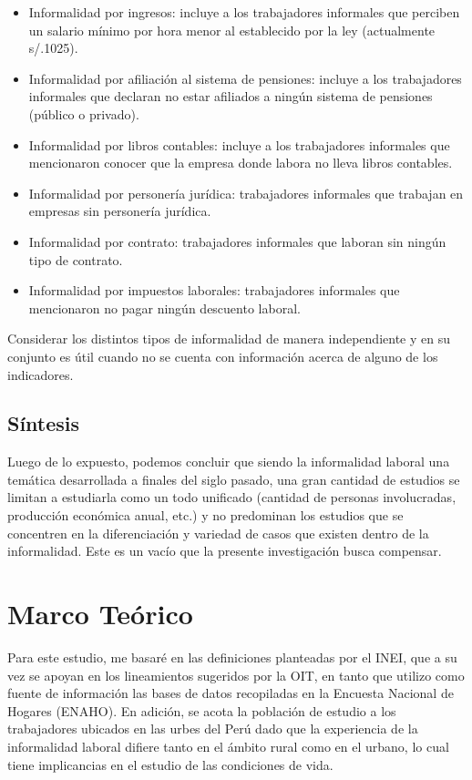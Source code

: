 \documentclass[
  letterpaper,
  12pt,
  oneside,
  spanish,
  doublespacing,
  headsepline,
  parskip]{MastersDoctoralThesis}
\begin{document}
\begin{itemize}
\item
  Informalidad por ingresos: incluye a los trabajadores informales que
  perciben un salario mínimo por hora menor al establecido por la ley
  (actualmente s/.1025).
\item
  Informalidad por afiliación al sistema de pensiones: incluye a los
  trabajadores informales que declaran no estar afiliados a ningún
  sistema de pensiones (público o privado).
\item
  Informalidad por libros contables: incluye a los trabajadores
  informales que mencionaron conocer que la empresa donde labora no
  lleva libros contables.
\item
  Informalidad por personería jurídica: trabajadores informales que
  trabajan en empresas sin personería jurídica.
\item
  Informalidad por contrato: trabajadores informales que laboran sin
  ningún tipo de contrato.
\item
  Informalidad por impuestos laborales: trabajadores informales que
  mencionaron no pagar ningún descuento laboral.
\end{itemize}

Considerar los distintos tipos de informalidad de manera independiente y
en su conjunto es útil cuando no se cuenta con información acerca de
alguno de los indicadores.

\hypertarget{suxedntesis}{%
\section{Síntesis}\label{suxedntesis}}

Luego de lo expuesto, podemos concluir que siendo la informalidad
laboral una temática desarrollada a finales del siglo pasado, una gran
cantidad de estudios se limitan a estudiarla como un todo unificado
(cantidad de personas involucradas, producción económica anual, etc.) y
no predominan los estudios que se concentren en la diferenciación y
variedad de casos que existen dentro de la informalidad. Este es un
vacío que la presente investigación busca compensar.


\hypertarget{sec-marco}{%
\chapter{Marco Teórico}\label{sec-marco}}

Para este estudio, me basaré en las definiciones planteadas por el INEI,
que a su vez se apoyan en los lineamientos sugeridos por la OIT, en
tanto que utilizo como fuente de información las bases de datos
recopiladas en la Encuesta Nacional de Hogares (ENAHO). En adición, se
acota la población de estudio a los trabajadores ubicados en las urbes
del Perú dado que la experiencia de la informalidad laboral difiere
tanto en el ámbito rural como en el urbano, lo cual tiene implicancias
en el estudio de las condiciones de vida.
\end{document}
